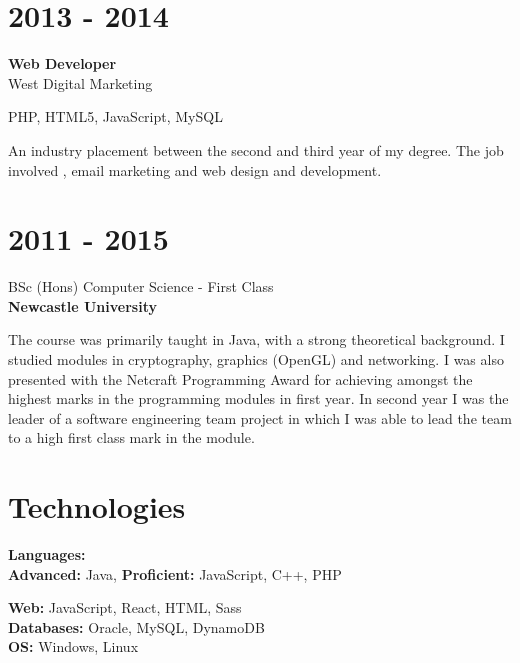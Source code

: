 \documentclass{article}
\begin{document}
\begin{minipage}[t]{0.35\linewidth}
\section*{2013 - 2014}
\textbf{Web Developer}\\
West Digital Marketing

\vspace{0.3cm}PHP, HTML5, JavaScript, MySQL

\vspace{0.3cm}An industry placement between the second and third year of my degree. The job involved , email marketing and web design and development.

\section*{2011 - 2015}
BSc (Hons) Computer Science - First Class\\
\textbf{Newcastle University}

\vspace{0.3cm}The course was primarily taught in Java, with a strong theoretical background. I studied modules in cryptography, graphics (OpenGL) and networking. I was also presented with the Netcraft Programming Award for achieving amongst the highest marks in the programming modules in first year. In second year I was the leader of a software engineering team project in which I was able to lead the team to a high first class mark in the module.

\section*{Technologies}

\textbf{Languages:}\\
\textbf{Advanced:} Java, \textbf{Proficient:} JavaScript, C++, PHP

\textbf{Web:} JavaScript, React, HTML, Sass\\
\textbf{Databases:} Oracle, MySQL, DynamoDB\\
\textbf{OS:} Windows, Linux
\end{minipage}
\end{document}
